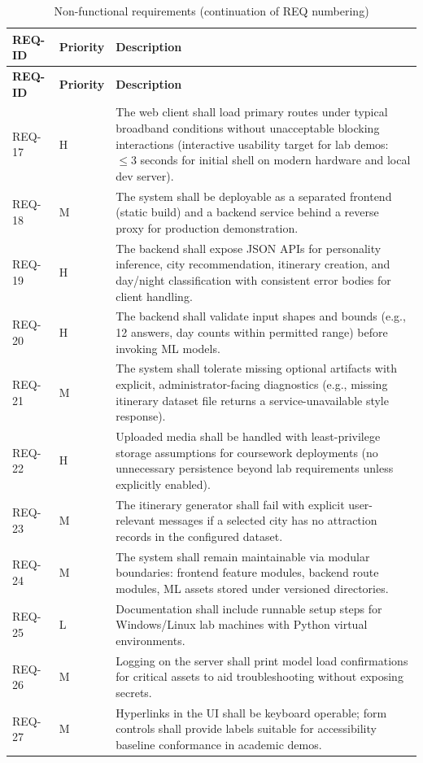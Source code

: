 \documentclass[12pt,oneside,openany]{report}
\begin{document}
\begin{longtable}{|p{}|p{}|p{}|}
\caption{Non-functional requirements (continuation of REQ numbering)\label{tab:nfreq}}\\
\hline
\textbf{REQ-ID} & \textbf{Priority} & \textbf{Description} \\
\hline
\endfirsthead
\hline
\textbf{REQ-ID} & \textbf{Priority} & \textbf{Description} \\
\hline
\endhead
\hline
\endfoot

REQ-17 & H & The web client shall load primary routes under typical broadband conditions without unacceptable blocking interactions (interactive usability target for lab demos: \(\le 3\) seconds for initial shell on modern hardware and local dev server). \\
\hline
REQ-18 & M & The system shall be deployable as a separated frontend (static build) and a backend service behind a reverse proxy for production demonstration. \\
\hline
REQ-19 & H & The backend shall expose JSON APIs for personality inference, city recommendation, itinerary creation, and day/night classification with consistent error bodies for client handling. \\
\hline
REQ-20 & H & The backend shall validate input shapes and bounds (e.g., 12 answers, day counts within permitted range) before invoking ML models. \\
\hline
REQ-21 & M & The system shall tolerate missing optional artifacts with explicit, administrator-facing diagnostics (e.g., missing itinerary dataset file returns a service-unavailable style response). \\
\hline
REQ-22 & H & Uploaded media shall be handled with least-privilege storage assumptions for coursework deployments (no unnecessary persistence beyond lab requirements unless explicitly enabled). \\
\hline
REQ-23 & M & The itinerary generator shall fail with explicit user-relevant messages if a selected city has no attraction records in the configured dataset. \\
\hline
REQ-24 & M & The system shall remain maintainable via modular boundaries: frontend feature modules, backend route modules, ML assets stored under versioned directories. \\
\hline
REQ-25 & L & Documentation shall include runnable setup steps for Windows/Linux lab machines with Python virtual environments. \\
\hline
REQ-26 & M & Logging on the server shall print model load confirmations for critical assets to aid troubleshooting without exposing secrets. \\
\hline
REQ-27 & M & Hyperlinks in the UI shall be keyboard operable; form controls shall provide labels suitable for accessibility baseline conformance in academic demos. \\
\hline
\end{longtable}
\end{document}
